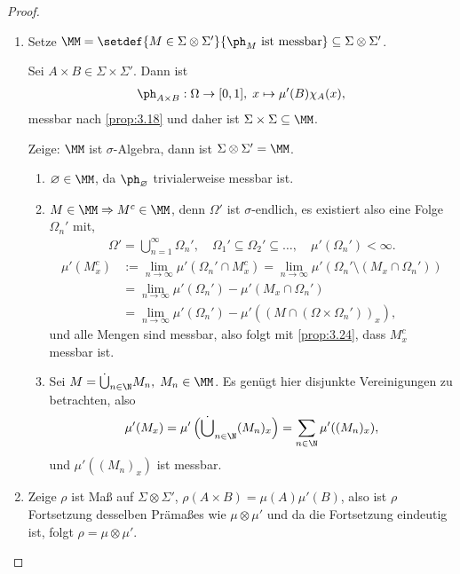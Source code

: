 \begin{proof}
\begin{enumerate}[label=(\roman{*})]
  \item Setze $\MM = \setdef{M\in\Sigma\otimes\Sigma'}{\ph_M \text{ ist
  messbar}}\subseteq\Sigma\otimes\Sigma'$.

  
Sei $A\times B\in\Sigma\times\Sigma'$. Dann ist
\begin{align*}
\ph_{A\times B} : \Omega\to[0,1],\; x\mapsto \mu'(B)\chi_A(x),
\end{align*}
messbar nach \ref{prop:3.18} und daher ist $\Sigma\times\Sigma\subseteq\MM$.

Zeige: $\MM$ ist $\sigma$-Algebra, dann ist $\Sigma\otimes\Sigma' = \MM$.

\begin{enumerate}[label=\arabic{*}.)]
  \item $\varnothing\in \MM$, da $\ph_{\varnothing}$ trivialerweise messbar ist.
  \item $M\in \MM \Rightarrow M^c\in\MM$, denn $\Omega'$ ist $\sigma$-endlich,
  es existiert also eine Folge $\Omega_n'$ mit,
\begin{align*}
\Omega' = \bigcup_{n=1}^\infty \Omega_n',\quad \Omega_1' \subseteq
\Omega_2'\subseteq \ldots,\quad \mu'(\Omega_n')<\infty.
\end{align*}
\begin{align*}
\mu'(M_x^c) &:= \lim\limits_{n\to\infty} \mu'\left(\Omega_n'\cap M_x^c\right)
= \lim\limits_{n\to\infty} \mu'\left(\Omega_n' \setminus (M_x\cap
\Omega_n')\right)
\\ &= \lim\limits_{n\to\infty} \mu'\left(\Omega_n'\right) - \mu'(M_x\cap
\Omega_n') \\ &= \lim\limits_{n\to\infty} \mu'\left(\Omega_n'\right) -
\mu'((M\cap(\Omega\times\Omega_n'))_x),
\end{align*}
und alle Mengen sind messbar, also folgt mit \ref{prop:3.24}, dass $M_x^c$
messbar ist.
\item Sei $M=\dot{\bigcup}_{n\in\N} M_n,\; M_n\in\MM$. Es genügt hier disjunkte
Vereinigungen zu betrachten, also
\begin{align*}
\mu'(M_x) = \mu'\left(\dot{\bigcup}_{n\in\N} (M_n)_x\right)
= \sum\limits_{n\in\N} \mu'((M_n)_x),
\end{align*}
und $\mu'((M_n)_x)$ ist messbar.
\end{enumerate}
\item Zeige $\rho$ ist Maß auf $\Sigma\otimes\Sigma'$, $\rho(A\times B) =
\mu(A)\mu'(B)$, also ist $\rho$ Fortsetzung desselben Prämaßes wie
$\mu\otimes\mu'$ und da die Fortsetzung eindeutig ist, folgt $\rho =
\mu\otimes\mu'$.\qedhere
\end{enumerate}
\end{proof}

